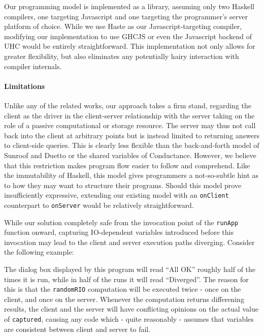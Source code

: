 \documentclass[preprint]{sigplanconf}
\begin{document}
Our programming model is implemented as a library, assuming only two Haskell
compilers, one targeting Javascript and one targeting the programmer's server
platform of choice. While we use Haste as our Javascript-targeting compiler,
modifying our implementation to use GHCJS or even the Javascript backend of UHC
would be entirely straightforward. This implementation not only allows for
greater flexibility, but also eliminates any potentially hairy interaction with
compiler internals.

\paragraph{Limitations} Unlike any of the related works, our approach takes a
firm stand, regarding the client as the driver in the client-server
relationship with the server taking on the role of a passive computational
or storage resource. The server may thus not call back into the client at
arbitrary points but is instead limited to returning answers to client-side
queries. This is clearly less flexible than the back-and-forth model of Sunroof
and Duetto or the shared variables of Conductance. However, we believe that
this restriction makes program flow easier to follow and comprehend. Like the
immutability of Haskell, this model gives programmers a not-so-subtle hint
as to how they may want to structure their programs. Should this model prove
insufficiently expressive, extending our existing model with an
\lstinline!onClient! counterpart to \lstinline!onServer! would be relatively
straightforward.

While our solution completely safe from the invocation point of the
\lstinline!runApp! function onward, capturing IO-dependent variables introduced
before this invocation may lead to the client and server execution paths
diverging. Consider the following example:


The dialog box displayed by this program will read ``All OK'' roughly half
of the times it is run, while in half of the runs it will read ``Diverged''.
The reason for this is that the \lstinline!randomRIO! computation will be
executed twice - once on the client, and once on the server. Whenever the
computation returns differening results, the client and the server will have
conflicting opinions on the actual value of \lstinline!captured!, causing any
code which - quite reasonably - assumes that variables are consistent between
client and server to fail.
\end{document}
